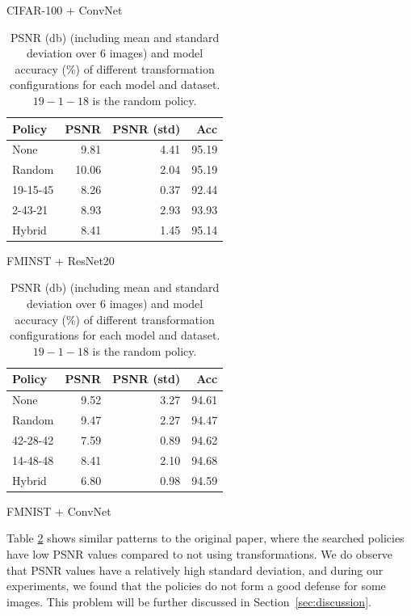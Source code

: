 \begin{center}
\begin{table}[h]
\begin{subtable}[h]{0.25\textwidth}
        \caption{CIFAR-100 + ConvNet}
    \end{subtable}
    \vfill
    \vspace{0mm}
    \begin{subtable}[h]{0.25\textwidth}
        \begin{tabular}{lrrr}
            \hline
             Policy   &   PSNR &   PSNR (std) &   Acc \\
            \hline
             None     &        9.81 &       4.41 & 95.19 \\
             Random   &       10.06 &       2.04 & 95.19 \\
             19-15-45 &        8.26 &       0.37 & 92.44 \\
             2-43-21  &        8.93 &       2.93 & 93.93 \\
             Hybrid   &        8.41 &       1.45 & 95.14 \\
            \hline
        \end{tabular}
        \caption{FMINST + ResNet20}
    \end{subtable}
    \hspace{35mm}%
    \begin{subtable}[h]{0.25\textwidth}
        \begin{tabular}{lrrr}
            \hline
             Policy   &   PSNR &   PSNR (std) &   Acc \\
            \hline
             None     &        9.52 &       3.27 & 94.61 \\
             Random   &        9.47 &       2.27 & 94.47 \\
             42-28-42 &        7.59 &       0.89 & 94.62 \\
             14-48-48 &        8.41 &       2.10 & 94.68 \\
             Hybrid   &        6.80 &       0.98 & 94.59 \\
            \hline
        \end{tabular}
        \caption{FMNIST + ConvNet}
    \end{subtable}
    \caption{PSNR (db) (including mean and standard deviation over $6$ images) and model accuracy (\%) of different transformation configurations for each model and dataset. $19-1-18$ is the random policy.}
    \label{tab:1}
\end{table}
\end{center}
Table \ref{tab:1} shows similar patterns to the original paper, where the searched policies have low PSNR values compared to not using transformations. We do observe that PSNR values have a relatively high standard deviation, and during our experiments, we found that the policies do not form a good defense for some images. This problem will be further discussed in Section~\ref{sec:discussion}.

